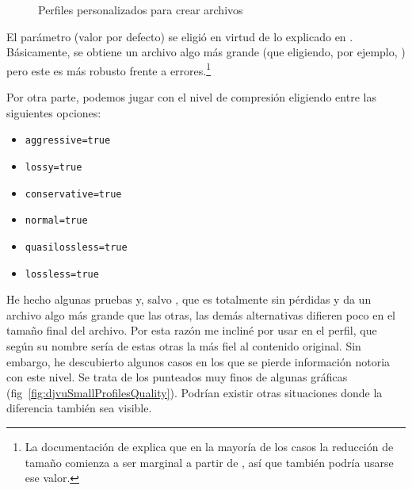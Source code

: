 \documentclass[%
	a5paper,
	10pt,
	twoside,
	openright,
	final,
]{memoir}
\begin{document}
{	\begin{figure}
		\begin{minipage}{\linewidth}
			\inputminted[bgcolor=bg]{c}{scripts/MyBitonal.profile}
			\vspace{-\baselineskip}
		\end{minipage}\vspace{\baselineskip}
		\begin{minipage}{\linewidth}
			\inputminted[bgcolor=bg]{c}{scripts/MyPhoto.profile}
			\vspace{-\baselineskip}
		\end{minipage}\vspace{\baselineskip}
		\begin{minipage}{\linewidth}
			\inputminted[bgcolor=bg]{c}{scripts/MyScan.profile}
			\vspace{-\baselineskip}
		\end{minipage}\vspace{\baselineskip}
		\caption{Perfiles personalizados para crear archivos \djvu\label{fig:djvuProfiles}}
	\end{figure}

	El parámetro  (valor por defecto) se eligió en virtud de lo explicado en \cite{DjVuDictionarySize}. Básicamente, se obtiene un archivo algo más grande (que eligiendo, por ejemplo, ) pero este es más robusto frente a errores.\footnote{La documentación de \dexpress explica que en la mayoría de los casos la reducción de tamaño comienza a ser marginal a partir de , así que también podría usarse ese valor.}

	Por otra parte, podemos jugar con el nivel de compresión eligiendo entre las siguientes opciones:
	\begin{itemize}[noitemsep]
		\item \texttt{aggressive=true}
		\item \texttt{lossy=true}
		\item \texttt{conservative=true}
		\item \texttt{normal=true}
		\item \texttt{quasilossless=true}
		\item \texttt{lossless=true}
	\end{itemize}

	He hecho algunas pruebas y, salvo , que es totalmente sin pérdidas y da un archivo algo más grande que las otras, las demás alternativas difieren poco en el tamaño final del archivo. Por esta razón me incliné por usar  en el perfil, que según su nombre sería de estas otras la más fiel al contenido original. Sin embargo, he descubierto algunos casos en los que se pierde información notoria con este nivel. Se trata de los punteados muy finos de algunas gráficas (fig~\ref{fig:djvuSmallProfilesQuality}). Podrían existir otras situaciones donde la diferencia también sea visible.

}
\end{document}
